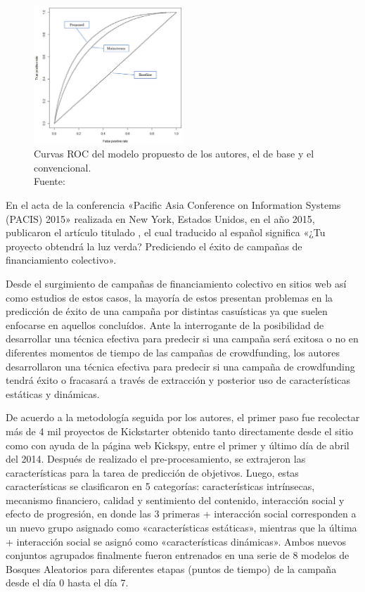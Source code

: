 \begin{figure}[!ht]
	\begin{center}
		\includegraphics[width=0.50\textwidth]{2/figures/zhou2015.jpg}
		\caption[Curvas ROC del modelo propuesto, el de base y el convencional]{Curvas ROC del modelo propuesto de los autores, el de base y el convencional.\\
			Fuente: \cite{pr_zhou2015projectdesc}}
		\label{2:fig113}
	\end{center}
\end{figure}

En el acta de la conferencia «Pacific Asia Conference on Information Systems (PACIS) 2015» realizada en New York, Estados Unidos, en el año 2015, \cite{pr_chen2015predcrowd} publicaron el artículo titulado , el cual traducido al español significa «¿Tu proyecto obtendrá la luz verda? Prediciendo el éxito de campañas de financiamiento colectivo».

Desde el surgimiento de campañas de financiamiento colectivo en sitios web así como estudios de estos casos, la mayoría de estos presentan problemas en la predicción de éxito de una campaña por distintas casuísticas ya que suelen enfocarse en aquellos concluídos. Ante la interrogante de la posibilidad de desarrollar una técnica efectiva para predecir si una campaña será exitosa o no en diferentes momentos de tiempo de las campañas de crowdfunding, los autores desarrollaron una técnica efectiva para predecir si una campaña de crowdfunding tendrá éxito o fracasará a través de extracción y posterior uso de características estáticas y dinámicas.

De acuerdo a la metodología seguida por los autores, el primer paso fue recolectar más de 4 mil proyectos de Kickstarter obtenido tanto directamente desde el sitio como con ayuda de la página web Kickspy, entre el primer y último día de abril del 2014. Después de realizado el pre-procesamiento, se extrajeron las características para la tarea de predicción de objetivos. Luego, estas características se clasificaron en 5 categorías: características intrínsecas, mecanismo financiero, calidad y sentimiento del contenido, interacción social y efecto de progresión, en donde las 3 primeras + interacción social corresponden a un nuevo grupo asignado como «características estáticas», mientras que la última + interacción social se asignó como «características dinámicas». Ambos nuevos conjuntos agrupados finalmente fueron entrenados en una serie de 8 modelos de Bosques Aleatorios para diferentes etapas (puntos de tiempo) de la campaña desde el día 0 hasta el día 7.

